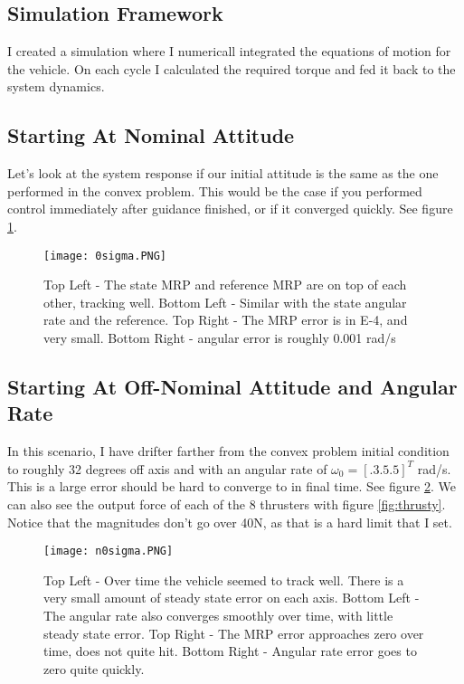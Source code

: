 \documentclass[conf]{new-aiaa}
\begin{document}
\begin{singlespace}
\subsection{Simulation Framework}
I created a simulation where I numericall integrated the equations of motion for the vehicle. On each cycle I calculated the required torque and fed it back to the system dynamics.


\subsection{Starting At Nominal Attitude}
Let's look at the system response if our initial attitude is the same as the one performed in the convex problem. This would be the case if you performed control immediately after guidance finished, or if it converged quickly. See figure \ref{fig:0sigma}.

\begin{figure}[!htbp] 
  \centering
  \texttt{[image: 0sigma.PNG]}
  \caption{Top Left - The state MRP and reference MRP are on top of each other, tracking well. Bottom Left - Similar with the state angular rate and the reference. Top Right - The MRP error is in E-4, and very small. Bottom Right - angular error is roughly 0.001 rad/s}
  \label{fig:0sigma}
 \end{figure}

\subsection{Starting At Off-Nominal Attitude and Angular Rate}
In this scenario, I have drifter farther from the convex problem initial condition to roughly 32 degrees off axis and with an angular rate of $\omega_0 = \left[.3 .5 .5 \right]^T$ rad/s. This is a large error should be hard to converge to in final time. See figure \ref{fig:n0sigma}. We can also see the output force of each of the 8 thrusters with figure \ref{fig:thrusty}. Notice that the magnitudes don't go over 40N, as that is a hard limit that I set.


\begin{figure}[!htbp] 
  \centering
  \texttt{[image: n0sigma.PNG]}
  \caption{Top Left - Over time the vehicle seemed to track well. There is a very small amount of steady state error on each axis. Bottom Left - The angular rate also converges smoothly over time, with little steady state error. Top Right - The MRP error approaches zero over time, does not quite hit. Bottom Right - Angular rate error goes to zero quite quickly.}
  \label{fig:n0sigma}
 \end{figure}



\end{singlespace}
\end{document}
